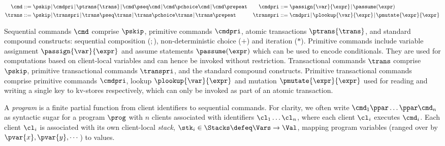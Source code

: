 \SpaceAboveMath
\begin{align*}
\cmd & ::=  
\pskip \!\mid\!
\cmdpri \!\mid\!  
\ptrans{\trans} \!\mid\! 
\cmd \pseq \cmd \!\mid\! 
\cmd \pchoice \cmd \!\mid\! 
\cmd \prepeat
&
 \cmdpri & ::=  
\passign{\var}{\expr} \!\mid\! 
\passume(\expr)
\\
\trans & ::=
\pskip \!\mid\!
\transpri \!\mid\! 
\trans \pseq \trans \!\mid\!
\trans \pchoice \trans \!\mid\!
\trans\prepeat    
&
\transpri & ::= 
\cmdpri \!\mid\!
\plookup{\var}{\expr} \!\mid\!
\pmutate{\expr}{\expr} 
\end{align*}
\SpaceBelowMath
 
\noindent
Sequential commands \(\cmd\) comprise \(\pskip\), primitive commands
\(\cmdpri\), atomic transactions \(\ptrans{\trans}\), and standard
compound constructs: sequential composition (\( ; \)), non-deterministic
choice (\( + \)) and iteration (\( * \)). 
Primitive commands include variable assignment
\(\passign{\var}{\expr}\) and assume statements \(\passume(\expr)\)
which can be used to encode conditionals. They are used for computations based on client-local variables and can hence be invoked
without restriction.  Transactional commands \(\trans\) comprise
\(\pskip\), primitive transactional commands \(\transpri\), and the
standard compound constructs.  Primitive transactional commands comprise
primitive commands \(\cmdpri\), lookup \(\plookup{\var}{\expr}\) and mutation
\(\pmutate{\expr}{\expr}\) used for reading and writing a single key to kv-stores
respectively, which can only be invoked as part of an atomic
transaction.


A \emph{program} is a finite partial function from client identifiers to sequential
commands.
For clarity, we often write \( \cmd_{1}\ppar \dots \ppar \cmd_{n}\) as syntactic sugar 
for a program \( \prog \) with \(n\) clients associated with identifiers
\(\cl_1 \dots \cl_n\), where each client \(\cl_i\) executes
\(\cmd_i\). 
Each client \(\cl_i\) is associated with its own client-local \emph{stack}, 
\(\stk_i \in \Stacks \defeq \Vars \to \Val\),  mapping program variables
(ranged over by \(\pvar{x}, \pvar{y}, \cdots\))
to values. 


